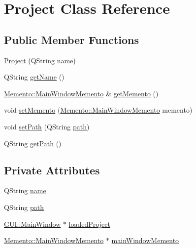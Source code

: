 \hypertarget{classModel_1_1Project}{}\section{Project Class Reference}
\label{classModel_1_1Project}
\subsection*{Public Member Functions}
\begin{DoxyCompactItemize}
\item 
\hyperlink{classModel_1_1Project_ae247a6a7beaace2e9d2637521160002c}{Project} (Q\+String \hyperlink{classModel_1_1Project_abc29e461e01cc0c712944f8f47f91331}{name})
\item 
Q\+String \hyperlink{classModel_1_1Project_ab6b223a95a460d422d940396d9a5657b}{get\+Name} ()
\item 
\hyperlink{classMemento_1_1MainWindowMemento}{Memento\+::\+Main\+Window\+Memento} \& \hyperlink{classModel_1_1Project_a439f54da110f371207bbedac6fe64bf0}{get\+Memento} ()
\item 
void \hyperlink{classModel_1_1Project_a06dcc543cbe7f60ea6a1da13d2585964}{set\+Memento} (\hyperlink{classMemento_1_1MainWindowMemento}{Memento\+::\+Main\+Window\+Memento} memento)
\item 
void \hyperlink{classModel_1_1Project_a41d3b419f9a56edd2854fb27715c94d5}{set\+Path} (Q\+String \hyperlink{classModel_1_1Project_a34b772573db9a14b1acb61b24709ae73}{path})
\item 
Q\+String \hyperlink{classModel_1_1Project_a1a94d0c9bf9dd725556721ac914025e3}{get\+Path} ()
\end{DoxyCompactItemize}
\subsection*{Private Attributes}
\begin{DoxyCompactItemize}
\item 
Q\+String \hyperlink{classModel_1_1Project_abc29e461e01cc0c712944f8f47f91331}{name}
\item 
Q\+String \hyperlink{classModel_1_1Project_a34b772573db9a14b1acb61b24709ae73}{path}
\item 
\hyperlink{classGUI_1_1MainWindow}{G\+U\+I\+::\+Main\+Window} $\ast$ \hyperlink{classModel_1_1Project_a6cb2f431c2af1d607c89d34fc5f7e135}{loaded\+Project}
\item 
\hyperlink{classMemento_1_1MainWindowMemento}{Memento\+::\+Main\+Window\+Memento} $\ast$ \hyperlink{classModel_1_1Project_a60039b787785b1bd2f7ccaa80ff07f01}{main\+Window\+Memento}
\end{DoxyCompactItemize}


